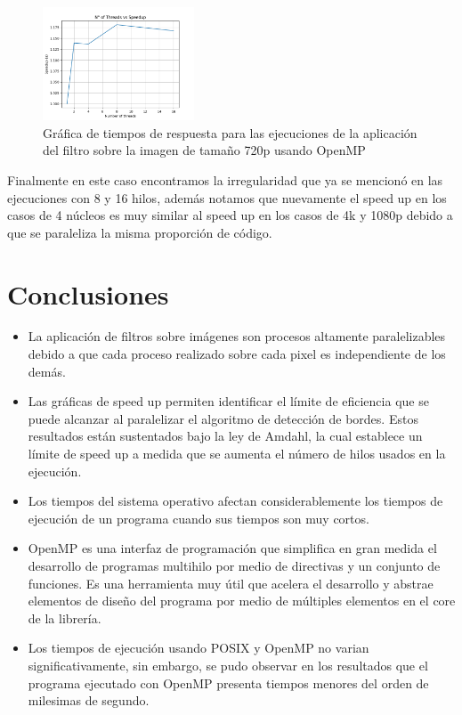 \begin{figure}[H]
    \centering
    \includegraphics[width=0.4\textwidth]{../plots/omp_720p_speedup.png}
    \caption{Gráfica de tiempos de respuesta para las ejecuciones de la aplicación del filtro sobre la imagen de tamaño 720p usando OpenMP}
\end{figure}

Finalmente en este caso encontramos la irregularidad que ya se mencionó en las ejecuciones con 8 y 16 hilos, además notamos que nuevamente el speed up en los casos de 4 núcleos es muy similar al speed up en los casos de 4k y 1080p debido a que se paraleliza la misma proporción de código.

\section{Conclusiones}

\begin{itemize}
    \item La aplicación de filtros sobre imágenes son procesos altamente paralelizables debido a que cada proceso realizado sobre cada pixel es independiente de los demás.
    \item Las gráficas de speed up permiten identificar el límite de eficiencia que se puede alcanzar al paralelizar el algoritmo de detección de bordes. Estos resultados están sustentados bajo la ley de Amdahl, la cual establece un límite de speed up a medida que se aumenta el número de hilos usados en la ejecución.
    \item Los tiempos del sistema operativo afectan considerablemente los tiempos de ejecución de un programa cuando sus tiempos son muy cortos.
    \item OpenMP es una interfaz de programación que simplifica en gran medida el desarrollo de programas multihilo por medio de directivas y un conjunto de funciones. Es una herramienta muy útil que acelera el desarrollo y abstrae elementos de diseño del programa por medio de múltiples elementos en el core de la librería.
    \item Los tiempos de ejecución usando POSIX y OpenMP no varian significativamente, sin embargo, se pudo observar en los resultados que el programa ejecutado con OpenMP presenta tiempos menores del orden de milesimas de segundo.
\end{itemize}


